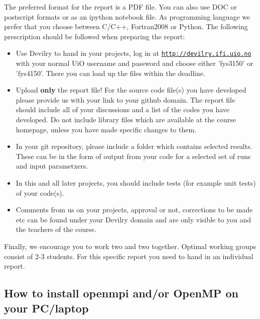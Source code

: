 \documentclass[10pt,showpacs,preprintnumbers,footinbib,amsmath,amssymb,aps,prl,twocolumn,groupedaddress,superscriptaddress,showkeys]{revtex4-1}
\begin{document}
The preferred format for the report is a PDF file. You can also use DOC or postscript formats or as an ipython notebook file.  As programming language we prefer that you choose between C/C++, Fortran2008 or Python. The following prescription should be followed when preparing the report:

\begin{itemize}
  \item Use Devilry to hand in your projects, log in  at  \href{{http://devilry.ifi.uio.no}}{\nolinkurl{http://devilry.ifi.uio.no}} with your normal UiO username and password and choose either 'fys3150' or 'fys4150'. There you can load up the files within the deadline.

  \item Upload \textbf{only} the report file!  For the source code file(s) you have developed please provide us with your link to your github domain.  The report file should include all of your discussions and a list of the codes you have developed.  Do not include library files which are available at the course homepage, unless you have made specific changes to them.

  \item In your git repository, please include a folder which contains selected results. These can be in the form of output from your code for a selected set of runs and input parametxers.

  \item In this and all later projects, you should include tests (for example unit tests) of your code(s).

  \item Comments  from us on your projects, approval or not, corrections to be made  etc can be found under your Devilry domain and are only visible to you and the teachers of the course.
\end{itemize}

\noindent
Finally, 
we encourage you to work two and two together. Optimal working groups consist of 
2-3 students. For this specific report you need to hand in an individual report.



\subsection*{How to install openmpi and/or OpenMP on your PC/laptop}
\end{document}
